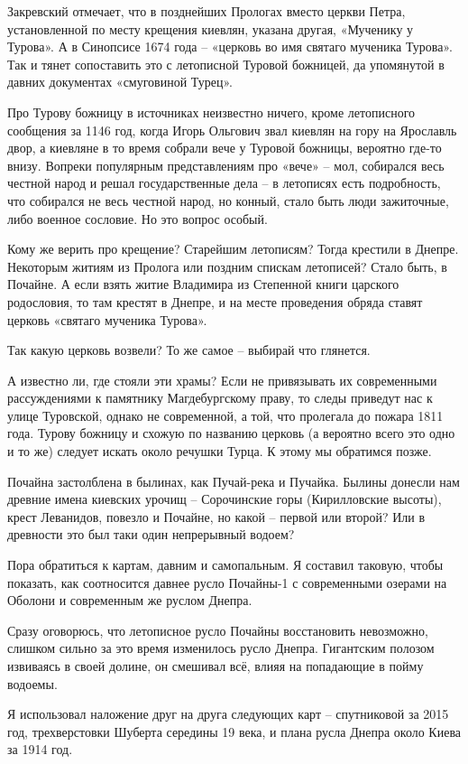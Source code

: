 Закревский отмечает, что в позднейших Прологах вместо церкви Петра, установленной по месту крещения киевлян, указана другая, «Мученику у Турова». А в Синопсисе 1674 года – «церковь во имя святаго мученика Турова». Так и тянет сопоставить это с летописной Туровой божницей, да упомянутой в давних документах «смуговиной Турец».

Про Турову божницу в источниках неизвестно ничего, кроме летописного сообщения за 1146 год, когда Игорь Ольгович звал киевлян на гору на Ярославль двор, а киевляне в то время собрали вече у Туровой божницы, вероятно где-то внизу. Вопреки популярным представлениям про «вече» – мол, собирался весь честной народ и решал государственные дела – в летописях есть подробность, что собирался не весь честной народ, но конный, стало быть люди зажиточные, либо военное сословие. Но это вопрос особый.

Кому же верить про крещение? Старейшим летописям? Тогда крестили в Днепре. Некоторым житиям из Пролога или поздним спискам летописей? Стало быть, в Почайне. А если взять житие Владимира из Степенной книги царского родословия, то там крестят в Днепре, и на месте проведения обряда ставят церковь «святаго мученика Турова».

Так какую церковь возвели? То же самое – выбирай что глянется.

А известно ли, где стояли эти храмы? Если не привязывать их современными рассуждениями к памятнику Магдебургскому праву, то следы приведут нас к улице Туровской, однако не современной, а той, что пролегала до пожара 1811 года. Турову божницу и схожую по названию церковь (а вероятно всего это одно и то же) следует искать около речушки Турца. К этому мы обратимся позже.

Почайна застолблена в былинах, как Пучай-река и Пучайка. Былины донесли нам древние имена киевских урочищ – Сорочинские горы (Кирилловские высоты), крест Леванидов, повезло и Почайне, но какой – первой или второй? Или в древности это был таки один непрерывный водоем?

Пора обратиться к картам, давним и самопальным. Я составил таковую, чтобы показать, как соотносится давнее русло Почайны-1 с современными озерами на Оболони и современным же руслом Днепра.

Сразу оговорюсь, что летописное русло Почайны восстановить невозможно, слишком сильно за это время изменилось русло Днепра. Гигантским полозом извиваясь в своей долине, он смешивал всё, влияя на попадающие в пойму водоемы.

Я использовал наложение друг на друга следующих карт – спутниковой за 2015 год, трехверстовки Шуберта середины 19 века, и плана русла Днепра около Киева за 1914 год.

